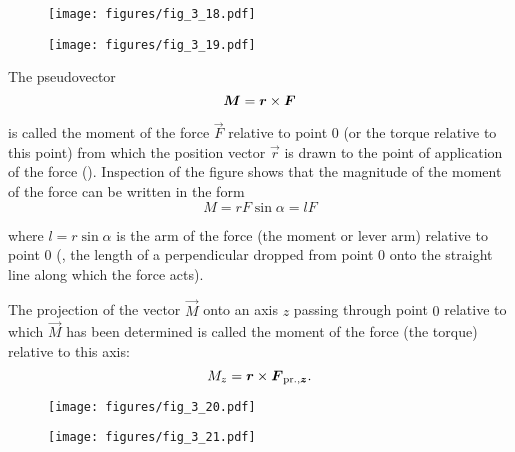 \begin{figure}[t]
	\begin{minipage}[t]{0.5\linewidth}
		\begin{center}
			\texttt{[image: figures/fig\_3\_18.pdf]}
			\caption[]{}
			\label{fig:3_18}
		\end{center}
	\end{minipage}
	\hspace{-0.05cm}
	\begin{minipage}[t]{0.5\linewidth}
		\begin{center}
			\texttt{[image: figures/fig\_3\_19.pdf]}
			\caption[]{}
			\label{fig:3_19}
		\end{center}
	\end{minipage}
	\vspace{-0.3cm}
\end{figure}

The pseudovector
\begin{equation}\label{eq:3_112}
\boldsymbol{M} = \boldsymbol{r}\times\boldsymbol{F}
\end{equation}

\noindent
is called the moment of the force $\vec{F}$ relative to point $0$ (or the torque relative to this point) from which the position vector $\vec{r}$ is drawn to the point of application of the force (). Inspection of the figure shows that the magnitude of the moment of the force can be written in the form
\begin{equation}\label{eq:3_113}
M = rF\sin\alpha = lF
\end{equation}

\noindent
where $l=r\sin\alpha$ is the arm of the force (the moment or lever arm) relative to point $0$ (\ie, the length of a perpendicular dropped from point $0$ onto the straight line along which the force acts).

The projection of the vector $\vec{M}$ onto an axis $z$ passing through point $0$ relative to which $\vec{M}$ has been determined is called the moment of the force (the torque) relative to this axis:
\begin{equation}\label{eq:3_114}
M_z = \boldsymbol{r}\times\boldsymbol{F}_{\text{pr.},\boldsymbol{z}}.
\end{equation}

\begin{figure}[t]
	\begin{minipage}[t]{0.5\linewidth}
		\begin{center}
			\texttt{[image: figures/fig\_3\_20.pdf]}
			\caption[]{}
			\label{fig:3_20}
		\end{center}
	\end{minipage}
	\hspace{-0.05cm}
	\begin{minipage}[t]{0.5\linewidth}
		\begin{center}
			\texttt{[image: figures/fig\_3\_21.pdf]}
			\caption[]{}
			\label{fig:3_21}
		\end{center}
	\end{minipage}
	\vspace{-0.3cm}
\end{figure}

